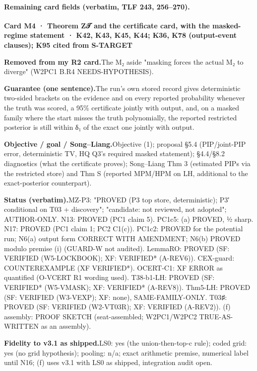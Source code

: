 \paragraph{Remaining card fields (verbatim, TLF 243, 256–270).}
{\small
\par\smallskip\noindent\textbf{Card M4 · Theorem Z𝒯 and the certificate card, with the masked-regime statement · K42, K43, K45, K44; K36, K78 (output-event clauses); K95 cited from S-TARGET}
\par\smallskip\noindent\textbf{Removed from my R2 card.}\enspace The M₂ aside "masking forces the actual M₂ to diverge" (W2PC1 B.R4 NEEDS-HYPOTHESIS).
\par\smallskip\noindent\textbf{Guarantee (one sentence).}\enspace The run's own stored record gives deterministic two-sided brackets on the evidence and on every reported probability whenever the truth was scored, a 95\% certificate jointly with output, and, on a masked family where the start misses the truth polynomially, the reported restricted posterior is still within δ₁ of the exact one jointly with output.
\par\smallskip\noindent\textbf{Objective / goal / Song–Liang.}\enspace Objective (1); proposal §5.4 (PIP/joint-PIP error, deterministic TV, HQ Q3's required masked statement); §4.4/§8.2 diagnostics (what the certificate proves); Song–Liang Thm 3 (estimated PIPs via the restricted store) and Thm S (reported MPM/HPM on LH, additional to the exact-posterior counterpart).
\par\smallskip\noindent\textbf{Status (verbatim).}\enspace MZ-P3: "PROVED (P3 top store, deterministic); P3′ conditional on T03 + discovery"; "candidate: not reviewed, not adopted"; AUTHOR-ONLY. N13: PROVED (PC1 claim 5). PC1c5: (a) PROVED, ½ sharp. N17: PROVED (PC1 claim 1; PC2 C1(c)). PC1c2: PROVED for the potential run; N6(a) output form CORRECT WITH AMENDMENT; N6(b) PROVED modulo premise (i) (GUARD-W not audited). LemmaRO: PROVED (SF: VERIFIED (W5-LOCKBOOK); XF: VERIFIED* (A-REV6)). CEX-guard: COUNTEREXAMPLE (XF VERIFIED*). OCERT-C1: XF ERROR as quantified (O-VCERT R1 wording used). T38-b1-LH: PROVED (SF: VERIFIED* (W5-VMASK); XF: VERIFIED* (A-REV8)). Thm5-LH: PROVED (SF: VERIFIED (W3-VEXP); XF: none), SAME-FAMILY-ONLY. T03♯: PROVED (SF: VERIFIED (W2-VT03R); XF: VERIFIED (A-REV2)). (f) assembly: PROOF SKETCH (seat-assembled; W2PC1/W2PC2 TRUE-AS-WRITTEN as an assembly).
\par\smallskip\noindent\textbf{Fidelity to v3.1 as shipped.}\enspace LS0: yes (the union-then-top-c rule); coded grid: yes (no grid hypothesis); pooling: n/a; exact arithmetic premise, numerical label until N16; (f) uses v3.1 with LS0 as shipped, integration audit open.
}
